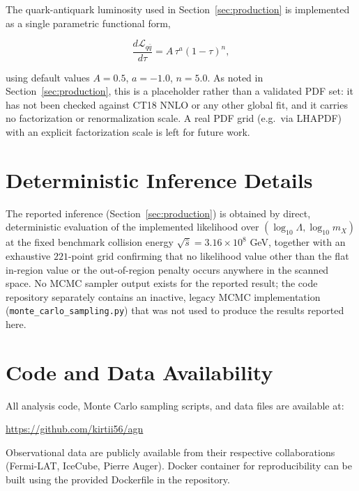 \documentclass[twocolumn,superscriptaddress,prd,nofootinbib]{revtex4-2}
\begin{document}
The quark-antiquark luminosity used in Section~\ref{sec:production} is implemented as a single parametric functional form,

\begin{equation}
\frac{d\mathcal{L}_{q\bar q}}{d\tau} = A\,\tau^{a}(1-\tau)^{n}, \label{eq:pdf_parametric}
\end{equation}

using default values $A=0.5$, $a=-1.0$, $n=5.0$. As noted in Section~\ref{sec:production}, this is a placeholder rather than a validated PDF set: it has not been checked against CT18 NNLO or any other global fit, and it carries no factorization or renormalization scale. A real PDF grid (e.g.\ via LHAPDF) with an explicit factorization scale is left for future work.

\section{Deterministic Inference Details}
\label{app:mcmc}

The reported inference (Section~\ref{sec:production}) is obtained by direct, deterministic evaluation of the implemented likelihood over $(\log_{10}\Lambda, \log_{10}m_X)$ at the fixed benchmark collision energy $\sqrt{\hat{s}}=3.16\times10^8$ GeV, together with an exhaustive $221$-point grid confirming that no likelihood value other than the flat in-region value or the out-of-region penalty occurs anywhere in the scanned space. No MCMC sampler output exists for the reported result; the code repository separately contains an inactive, legacy MCMC implementation (\texttt{monte\_carlo\_sampling.py}) that was not used to produce the results reported here.

\section{Code and Data Availability}
\label{app:code}

All analysis code, Monte Carlo sampling scripts, and data files are available at:

\url{https://github.com/kirtii56/agn}

Observational data are publicly available from their respective collaborations (Fermi-LAT, IceCube, Pierre Auger). Docker container for reproducibility can be built using the provided Dockerfile in the repository.
\end{document}
